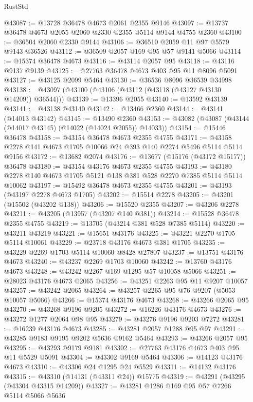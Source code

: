 \begin{lexlean}{RustStd}
\begin{coremodule}
@43087 := @13728 @36478 @4673 @2061 @2355 @9146
@43097 := @13737 @36478 @4673 @2055 @2060 @2330 @2355 @5114 @9144 @4755 @2360
@43100 := @36504 @2060 @2330 @9144
@43106 := @36510 @2059 @11 @97 @5579 @9143 @36526
@43112 := @36509 @2057 @169 @95 @57 @9141 @5066
@43114 := @15374 @36478 @4673
@43116 := @43114 @2057 @95
@43118 := @43116 @9137 @9139
@43125 := @27763 @36478 @4673 @403 @95 @11 @8096 @5091
@43127 := @43125 @2099 @5464
@43130 := @36536 @8096 @36539 @34998
@43138 := @43097 (@43100 (@43106 (@43112 (@43118 (@43127 @43130 @14209)) @36544)))
@43139 := @13396 @2055
@43140 := @13592 @43139
@43141 := @43138 @43140
@43142 := @13466 @2360
@43144 := @43141 (@14013 @43142)
@43145 := @13490 @2360
@43153 := @43082 (@43087 (@43144 (@14017 @43145) (@14022 (@14024 @2055)) @14033))
@43154 := @15446 @36478
@43158 := @43154 @36478 @4673 @2355 @4755
@43171 := @43158 @2278 @141 @4673 @1705 @10066 @24 @393 @140 @2274 @5496 @5114 @5114 @9156
@43172 := @13682 @2074
@43176 := @13677 (@15176 (@43172 @15177)) @36478
@43180 := @43154 @43176 @4673 @2355 @4755
@43193 := @43180 @2278 @140 @4673 @1705 @5121 @138 @381 @528 @2270 @7385 @5114 @5114 @10062
@43197 := @15492 @36478 @4673 @2355 @4755
@43201 := @43193 (@43197 @2278 @4673 @1705)
@43202 := @15514 @2278
@43205 := @43201 (@15502 (@43202 @138))
@43206 := @15520 @2355
@43207 := @43206 @2278
@43211 := @43205 (@13957 (@43207 @140 @381))
@43214 := @15528 @36478 @2355 @4755
@43219 := @13705 (@43214 @381 @528 @7385 @5114)
@43220 := @43211 @43219
@43221 := @15651 @43176
@43225 := @43221 @2270 @1705 @5114 @10061
@43229 := @23718 @43176 @4673 @381 @1705
@43235 := @43229 @2269 @1703 @5114 @10060 @8428 @27807
@43237 := @13751 @43176 @4673
@43240 := @43237 @2269 @1703 @10060
@43242 := @13760 @43176 @4673
@43248 := @43242 @2267 @169 @1295 @57 @10058 @5066
@43251 := @28023 @43176 @4673 @2065
@43256 := @43251 @2263 @95 @11 @9207 @10057
@43257 := @43242 @2065
@43264 := @43257 @2265 @95 @76 @9207 (@5053 @10057 @5066)
@43266 := @15374 @43176 @4673
@43268 := @43266 @2065 @95
@43270 := @43268 @9196 @9205
@43272 := @16226 @43176 @4673
@43276 := @43272 @1277 @2064 @98 @95
@43279 := @43276 @9196 @9203 @7272
@43281 := @16239 @43176 @4673
@43285 := @43281 @2057 @1288 @95 @97
@43291 := @43285 @9183 @9195 @9202 @5636 @9162 @5464
@43293 := @43266 @2057 @95
@43295 := @43293 @9179 @9181
@43302 := @27763 @43176 @4673 @403 @95 @11 @5529 @5091
@43304 := @43302 @9169 @5464
@43306 := @14123 @43176 @4673
@43310 := @43306 @24 @1295 @24 @5529
@43311 := @14132 @43176
@43315 := @43310 (@14131 (@43311 @24)) @15775
@43319 := @43291 (@43295 (@43304 @43315 @14209))
@43327 := @43281 @1286 @169 @95 @57 @7266 @5114 @5066 @5636

\end{coremodule}
\end{lexlean}
